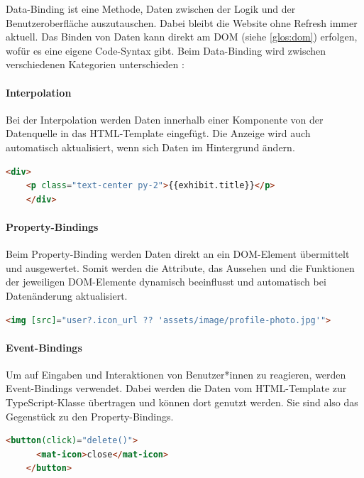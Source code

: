 Data-Binding ist eine Methode, Daten zwischen der Logik und der Benutzeroberfläche auszutauschen. Dabei bleibt die Website ohne Refresh immer aktuell. Das Binden von Daten kann direkt am DOM (siehe \ref{glos:dom}) erfolgen, wofür es eine eigene Code-Syntax gibt. Beim Data-Binding wird zwischen  verschiedenen Kategorien unterschieden \cite{AngularBuch} \cite{BindingSyntax}:  
    

\paragraph{Interpolation}
Bei der Interpolation werden Daten innerhalb einer Komponente von der Datenquelle in das HTML-Template eingefügt. Die Anzeige wird auch automatisch aktualisiert, wenn sich Daten im Hintergrund ändern. \cite{BindingSyntax}

\begin{lstlisting}[caption={{Beispiel für Interpolation in der 3D-Gallery}},language=HTML,label=lst:impl:interpolation]
    <div>
    <p class="text-center py-2">{{exhibit.title}}</p>
    </div>
\end{lstlisting}

\paragraph{Property-Bindings}
Beim Property-Binding werden Daten direkt an ein DOM-Element übermittelt und ausgewertet. Somit werden die Attribute, das Aussehen und die Funktionen der jeweiligen DOM-Elemente dynamisch beeinflusst und automatisch bei Datenänderung aktualisiert. \cite{AngularPropertyBinding}
\begin{lstlisting}[caption={{Beispiel für Property-Bindings in der 3D-Gallery}},language=HTML,label=lst:impl:property-binding]
    <img [src]="user?.icon_url ?? 'assets/image/profile-photo.jpg'">
\end{lstlisting}

\paragraph{Event-Bindings}
Um auf Eingaben und Interaktionen von Benutzer*innen zu reagieren, werden Event-Bindings verwendet. Dabei werden die Daten vom HTML-Template zur TypeScript-Klasse übertragen und können dort genutzt werden. Sie sind also das Gegenstück zu den Property-Bindings. \cite{AngularEventBinding}
\begin{lstlisting}[caption={{Beispiel für Event-Bindings in der 3D-Gallery}},language=HTML,label=lst:impl:event-binding]
    <button(click)="delete()">
      <mat-icon>close</mat-icon>
    </button>
\end{lstlisting}

